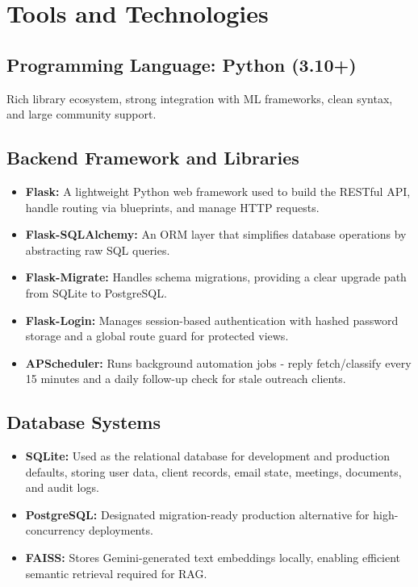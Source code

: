 \documentclass[12pt,a4paper]{report}
\begin{document}
\section{Tools and Technologies}

\subsection{Programming Language: Python (3.10+)}
Rich library ecosystem, strong integration with ML frameworks, clean syntax, and large community support.

\subsection{Backend Framework and Libraries}
\begin{itemize}
    \item \textbf{Flask:} A lightweight Python web framework used to build the RESTful API, handle routing via blueprints, and manage HTTP requests.
    \item \textbf{Flask-SQLAlchemy:} An ORM layer that simplifies database operations by abstracting raw SQL queries.
    \item \textbf{Flask-Migrate:} Handles schema migrations, providing a clear upgrade path from SQLite to PostgreSQL.
    \item \textbf{Flask-Login:} Manages session-based authentication with hashed password storage and a global route guard for protected views.
    \item \textbf{APScheduler:} Runs background automation jobs - reply fetch/classify every 15 minutes and a daily follow-up check for stale outreach clients.
\end{itemize}

\subsection{Database Systems}
\begin{itemize}
    \item \textbf{SQLite:} Used as the relational database for development and production defaults, storing user data, client records, email state, meetings, documents, and audit logs.
    \item \textbf{PostgreSQL:} Designated migration-ready production alternative for high-concurrency deployments.
    \item \textbf{FAISS:} Stores Gemini-generated text embeddings locally, enabling efficient semantic retrieval required for RAG.
\end{itemize}
\end{document}

